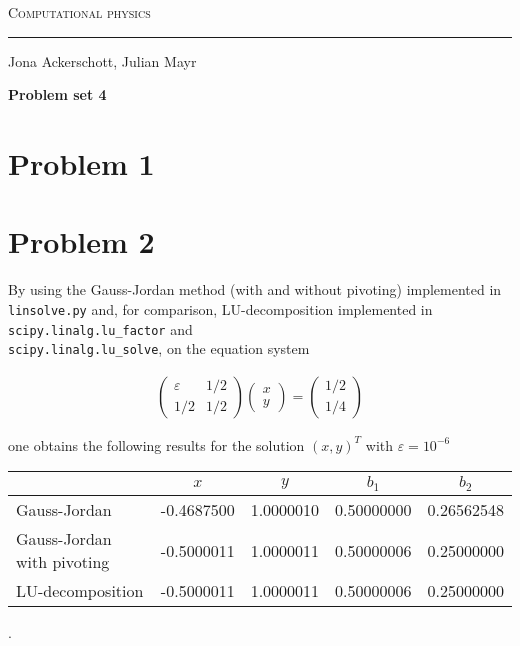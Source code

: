 \documentclass[12pt, a4paper]{article}
\begin{document}
  
  \centerline{\Huge\scshape Computational physics}
  \vspace*{0.5cm}
  \hrule
  \vspace*{0.5cm}
  \centerline{Jona Ackerschott, Julian Mayr}
  \vspace*{1cm}
  \centerline{\Large\bfseries Problem set 4}
  \vspace*{0.5cm}

  \section*{Problem 1}

  \section*{Problem 2}
  By using the Gauss-Jordan method (with and without pivoting) implemented in {\tt linsolve.py} and, for comparison, LU-decomposition implemented in {\tt scipy.linalg.lu\_factor} and\\ {\tt scipy.linalg.lu\_solve}, on the equation system

  \begin{align}
    \begin{pmatrix} \varepsilon & 1/2 \\ 1/2 & 1/2 \end{pmatrix}
    \begin{pmatrix} x \\ y \end{pmatrix} = 
    \begin{pmatrix} 1/2 \\ 1/4 \end{pmatrix}
    \label{p1_eqsys}
  \end{align}

  \noindent
  one obtains the following results for the solution $(x, y)^T$ with $\varepsilon = 10^{-6}$

  \begin{center}
    \begin{tabular}{l | c | c | c | c}
                                 & $x$        & $y$       & $b_1$       & $b_2$      \\
      \hline
      Gauss-Jordan               & -0.4687500 & 1.0000010 & 0.50000000  & 0.26562548 \\
      \hline
      Gauss-Jordan with pivoting & -0.5000011 & 1.0000011 & 0.50000006  & 0.25000000 \\
      \hline
      LU-decomposition           & -0.5000011 & 1.0000011 & 0.50000006  & 0.25000000
    \end{tabular}
  .
  \end{center}
\end{document}
